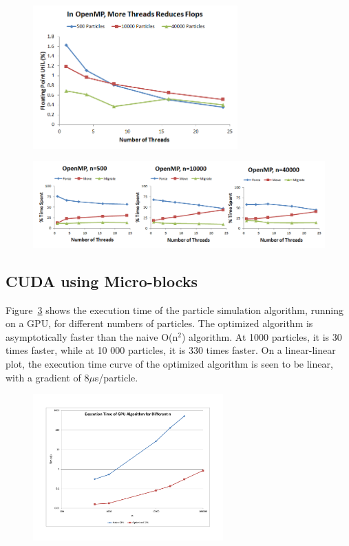 \documentclass[11pt]{article} %
\begin{document}
\begin{figure}[!h]
\centering
\includegraphics[width=0.7\textwidth]{figures/openmp_mb_flops.png}
\caption{}
\label{openmp_mb_flops}
\end{figure}

\begin{figure}[!h]
\centering
\includegraphics[width=1\textwidth]{figures/openmp_mb_rtime.png}
\caption{}
\label{openmp_mb_rtime}
\end{figure}

\subsection{CUDA using Micro-blocks}

Figure~\ref{gpu_time_vs_n} shows the execution time of the particle simulation algorithm, running on a GPU, for different numbers of particles. The optimized algorithm is asymptotically faster than the naive O(n$^2$) algorithm. At 1000 particles, it is 30 times faster, while at 10 000 particles, it is 330 times faster. On a linear-linear plot, the execution time curve of the optimized algorithm is seen to be linear, with a gradient of 8$\mu$s/particle.

\begin{figure}[!h]
\centering
\includegraphics*[width=0.65\textwidth, viewport= 70 70 730 550]{figures/gpu_time_vs_n}
\caption{}
\label{gpu_time_vs_n}
\end{figure}
\end{document}

